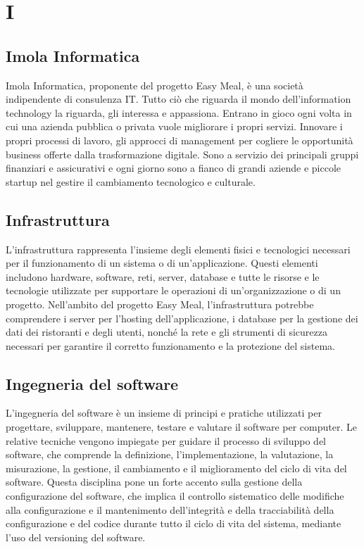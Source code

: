 \section{I} 
\subsection{Imola Informatica} 
Imola Informatica, proponente del progetto Easy Meal, è una società indipendente di consulenza IT. Tutto ciò che riguarda il mondo dell’information technology la riguarda, gli interessa e appassiona. Entrano in gioco ogni volta in cui una azienda pubblica o privata vuole migliorare i propri servizi. Innovare i propri processi di lavoro, gli approcci di management per cogliere le opportunità business offerte dalla trasformazione digitale. Sono a servizio dei principali gruppi finanziari e assicurativi e ogni giorno sono a fianco di grandi aziende e piccole startup nel gestire il cambiamento tecnologico e culturale.
\subsection{Infrastruttura} 
L'infrastruttura rappresenta l'insieme degli elementi fisici e tecnologici necessari per il funzionamento di un sistema o di un'applicazione. Questi elementi includono hardware, software, reti, server, database e tutte le risorse e le tecnologie utilizzate per supportare le operazioni di un'organizzazione o di un progetto. Nell'ambito del progetto Easy Meal, l'infrastruttura potrebbe comprendere i server per l'hosting dell'applicazione, i database per la gestione dei dati dei ristoranti e degli utenti, nonché la rete e gli strumenti di sicurezza necessari per garantire il corretto funzionamento e la protezione del sistema.
\subsection{Ingegneria del software} 
L'ingegneria del software è un insieme di principi e pratiche utilizzati per progettare, sviluppare, mantenere, testare e valutare il software per computer. Le relative tecniche vengono impiegate per guidare il processo di sviluppo del software, che comprende la definizione, l'implementazione, la valutazione, la misurazione, la gestione, il cambiamento e il miglioramento del ciclo di vita del software. Questa disciplina pone un forte accento sulla gestione della configurazione del software, che implica il controllo sistematico delle modifiche alla configurazione e il mantenimento dell'integrità e della tracciabilità della configurazione e del codice durante tutto il ciclo di vita del sistema, mediante l'uso del versioning del software.
